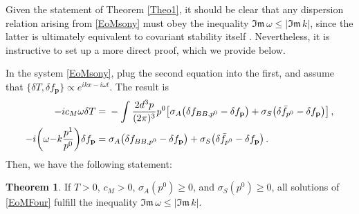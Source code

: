 \documentclass[a4paper, amsfonts, amssymb, amsmath, reprint, showkeys, nofootinbib, twoside,notitlepage,onecolumn]{revtex4-2}
\theoremstyle{definition}
\theoremstyle{theorem}
\newtheorem{theorem}{Theorem}
\theoremstyle{corollary}
\begin{document}
Given the statement of Theorem \ref{Theo1}, it should be clear that any dispersion relation arising from \eqref{EoMsony} must obey the inequality $\mathfrak{Im}\,\omega\leq |\mathfrak{Im} \, k|$, since the latter is ultimately equivalent to covariant stability itself \cite{GavassinoBounds2023}. Nevertheless, it is instructive to set up a more direct proof, which we provide below.

In the system \eqref{EoMsony}, plug the second equation into the first, and assume that $\{\delta T,\delta f_\mathbf{p} \}\propto e^{ikx-i\omega t}$. The result is
\begin{equation}\label{EoMFour}
\begin{split}
-i c_M \omega \delta T={}& -\int \dfrac{2d^3 p}{(2\pi)^3 } p^0 \big[ \sigma_A \big(\delta f_{BB,p^0}-\delta f_\mathbf{p}\big)+\sigma_S \big(\delta \Bar{f}_{p^0} -\delta f_\mathbf{p}\big)\big]  \, , \\
-i\bigg(\omega {-}k\dfrac{p^1}{p^0} \bigg) \delta f_\mathbf{p} ={}& \sigma_A \big(\delta f_{BB,p^0}-\delta f_\mathbf{p}\big)+\sigma_S \big(\delta \Bar{f}_{p^0} -\delta f_\mathbf{p}\big) \, . \\
\end{split}
\end{equation}
Then, we have the following statement:
\begin{theorem}\label{theo2}
If $T>0$, $c_M>0$, $\sigma_A(p^0)\geq 0$, and $\sigma_S(p^0)\geq 0$, all solutions of \eqref{EoMFour} fulfill the inequality $\mathfrak{Im}\, \omega \leq |\mathfrak{Im}\, k|$.
\end{theorem}
\end{document}
